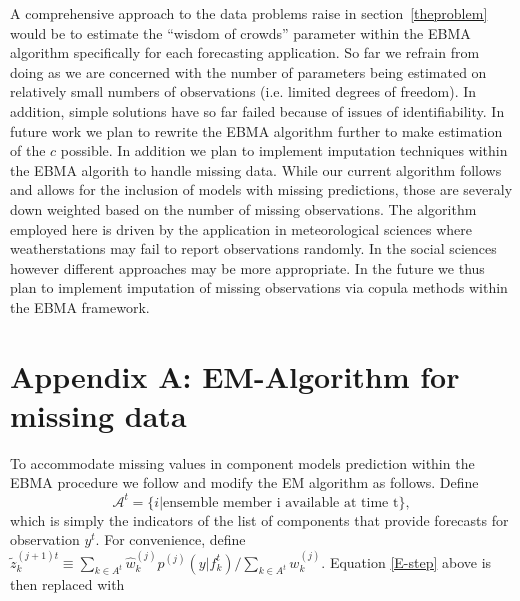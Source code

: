 \documentclass[12pt,fullpage,endnotes]{article}
\begin{document}
A comprehensive approach to the data problems raise in section~\ref{theproblem} would be to estimate the ``wisdom of crowds'' parameter within the EBMA algorithm specifically for each forecasting application. So far we refrain from doing as we are concerned with the number of parameters being estimated on relatively small numbers of observations (i.e. limited degrees of freedom). In addition, simple solutions have so far failed because of issues of identifiability. In future work we plan to rewrite the EBMA algorithm further to make estimation of the $c$ possible.  
In addition we plan to implement imputation techniques within the EBMA algorith to handle missing data. While our current algorithm follows \citet{Fraley:2010} and allows for the inclusion of models with missing predictions, those are severaly down weighted based on the number of missing observations. The algorithm employed here is driven by the application in meteorological sciences where weatherstations may fail to report observations randomly. In the social sciences however different approaches may be more appropriate. In the future we thus plan to implement imputation of missing observations via copula methods within the EBMA framework. 

\singlespacing




 \newpage
 \appendix

\doublespacing

 \section*{Appendix A: EM-Algorithm for missing data}

To accommodate missing values in component models prediction within
the EBMA procedure we follow \citet{Fraley:2010} and modify the EM
algorithm as follows.  Define $$\mathcal{A}^t = \{i|\mbox{ensemble
  member i available at time t}\},$$\noindent which is simply the
indicators of the list of components that provide forecasts for
observation $y^t$.  For convenience, define $\tilde{z}_k^{(j+1)t}
\equiv {{\underset{k \in
      A^t}{\sum}}\hat{w}^{(j)}_kp^{(j)}(y|f_{k}^{t})}/{\underset{k \in
    A^t}\sum w_k^{(j)}}$.  Equation \ref{E-step} above is then
replaced with
\end{document}
